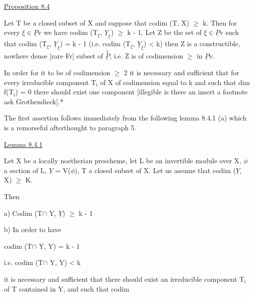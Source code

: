 
\uline{Proposition 8.4}

Let T be a closed subset of X and suppose that codim (T, X) $\geq$
k. Then for every $\xi \in \underline{P}$v we have codim (T$_{\xi}$, $\underline{Y}_{\xi}$) $\geq$ k - 1. Let Z be
the set of $\xi \in \underline{P}$v such that codim (T$_{\xi}$, $\underline{Y}_{\xi}$) = k - 1 (i.e. codim (T$_{\xi}$,
$\underline{Y}_{\xi}$) < k) then Z is a constructible, nowhere dense [rare Fr]
subset of $\overset{\text{v}}{\underline{P}}$, i.e. $\overline{\text{Z}}$ is of codimension $\geq$  in $\underline{P}$v.

In order for it to be of codimension $\geq$ 2 it is necessary and
sufficient that for every irreducible component T$_{\text{i}}$ of X of
codimension equal to k and such that dim f(T$_{\text{i}}$) = 0 there should
exist one component  [illegible is there an insert a footnote ask
Grothendieck].*

The first assertion follows immediately from the following lemma
8.4.1 (a) which is a remorseful afterthought to paragraph 5.

\uline{Lemma 8.4.1}

Let X be a locally noetherian prescheme, let L be an
invertible module over X, $\phi$ a section of L, $\underline{Y}$ = V($\phi$), T a closed
subset of X. Let us assume that codim ($\underline{Y}$, X) $\geq$ K.

Then

a) Codim (T$\cap$ Y, $\underline{Y}$) $\geq$ k - 1

b) In order to have

codim (T$\cap$ Y, Y) = k - 1

i.e. codim (T$\cap$ Y, Y) < k

it is necessary and sufficient that there should exist an
irreducible component T$_{\text{i}}$ of T contained in Y, and such that codim

